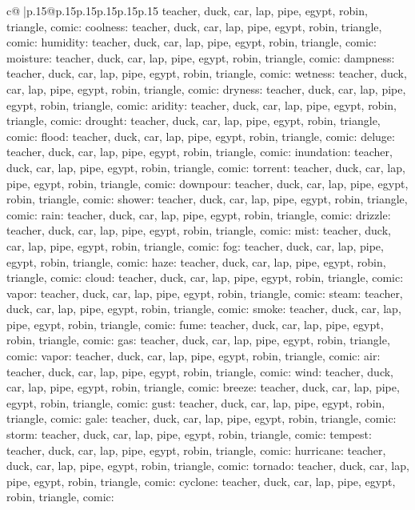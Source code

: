 \documentclass{article}
\begin{document}
{\begin{supertabular}{c@{$\;$}|p{.15\linewidth}@{}p{.15\linewidth}p{.15\linewidth}p{.15\linewidth}p{.15\linewidth}p{.15\linewidth}}
{{{teacher, duck, car, lap, pipe, egypt, robin, triangle, comic\n\nCLUE: coolness\nTARGETS: teacher, duck, car, lap, pipe, egypt, robin, triangle, comic\n\nCLUE: humidity\nTARGETS: teacher, duck, car, lap, pipe, egypt, robin, triangle, comic\n\nCLUE: moisture\nTARGETS: teacher, duck, car, lap, pipe, egypt, robin, triangle, comic\n\nCLUE: dampness\nTARGETS: teacher, duck, car, lap, pipe, egypt, robin, triangle, comic\n\nCLUE: wetness\nTARGETS: teacher, duck, car, lap, pipe, egypt, robin, triangle, comic\n\nCLUE: dryness\nTARGETS: teacher, duck, car, lap, pipe, egypt, robin, triangle, comic\n\nCLUE: aridity\nTARGETS: teacher, duck, car, lap, pipe, egypt, robin, triangle, comic\n\nCLUE: drought\nTARGETS: teacher, duck, car, lap, pipe, egypt, robin, triangle, comic\n\nCLUE: flood\nTARGETS: teacher, duck, car, lap, pipe, egypt, robin, triangle, comic\n\nCLUE: deluge\nTARGETS: teacher, duck, car, lap, pipe, egypt, robin, triangle, comic\n\nCLUE: inundation\nTARGETS: teacher, duck, car, lap, pipe, egypt, robin, triangle, comic\n\nCLUE: torrent\nTARGETS: teacher, duck, car, lap, pipe, egypt, robin, triangle, comic\n\nCLUE: downpour\nTARGETS: teacher, duck, car, lap, pipe, egypt, robin, triangle, comic\n\nCLUE: shower\nTARGETS: teacher, duck, car, lap, pipe, egypt, robin, triangle, comic\n\nCLUE: rain\nTARGETS: teacher, duck, car, lap, pipe, egypt, robin, triangle, comic\n\nCLUE: drizzle\nTARGETS: teacher, duck, car, lap, pipe, egypt, robin, triangle, comic\n\nCLUE: mist\nTARGETS: teacher, duck, car, lap, pipe, egypt, robin, triangle, comic\n\nCLUE: fog\nTARGETS: teacher, duck, car, lap, pipe, egypt, robin, triangle, comic\n\nCLUE: haze\nTARGETS: teacher, duck, car, lap, pipe, egypt, robin, triangle, comic\n\nCLUE: cloud\nTARGETS: teacher, duck, car, lap, pipe, egypt, robin, triangle, comic\n\nCLUE: vapor\nTARGETS: teacher, duck, car, lap, pipe, egypt, robin, triangle, comic\n\nCLUE: steam\nTARGETS: teacher, duck, car, lap, pipe, egypt, robin, triangle, comic\n\nCLUE: smoke\nTARGETS: teacher, duck, car, lap, pipe, egypt, robin, triangle, comic\n\nCLUE: fume\nTARGETS: teacher, duck, car, lap, pipe, egypt, robin, triangle, comic\n\nCLUE: gas\nTARGETS: teacher, duck, car, lap, pipe, egypt, robin, triangle, comic\n\nCLUE: vapor\nTARGETS: teacher, duck, car, lap, pipe, egypt, robin, triangle, comic\n\nCLUE: air\nTARGETS: teacher, duck, car, lap, pipe, egypt, robin, triangle, comic\n\nCLUE: wind\nTARGETS: teacher, duck, car, lap, pipe, egypt, robin, triangle, comic\n\nCLUE: breeze\nTARGETS: teacher, duck, car, lap, pipe, egypt, robin, triangle, comic\n\nCLUE: gust\nTARGETS: teacher, duck, car, lap, pipe, egypt, robin, triangle, comic\n\nCLUE: gale\nTARGETS: teacher, duck, car, lap, pipe, egypt, robin, triangle, comic\n\nCLUE: storm\nTARGETS: teacher, duck, car, lap, pipe, egypt, robin, triangle, comic\n\nCLUE: tempest\nTARGETS: teacher, duck, car, lap, pipe, egypt, robin, triangle, comic\n\nCLUE: hurricane\nTARGETS: teacher, duck, car, lap, pipe, egypt, robin, triangle, comic\n\nCLUE: tornado\nTARGETS: teacher, duck, car, lap, pipe, egypt, robin, triangle, comic\n\nCLUE: cyclone\nTARGETS: teacher, duck, car, lap, pipe, egypt, robin, triangle, comic\n\nCLUE: }}}
\end{supertabular}}
\end{document}
